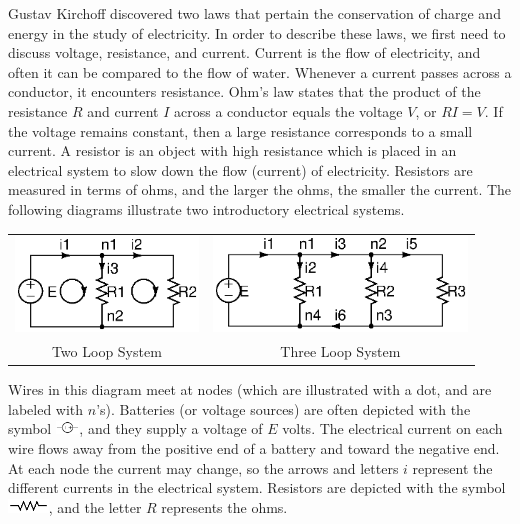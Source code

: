 \documentclass[10pt]{article}
\begin{document}
Gustav Kirchoff discovered two laws that pertain the conservation of charge and energy in the study of electricity.  In order to describe these laws, we first need to discuss voltage, resistance, and current.  Current is the flow of electricity, and often it can be compared to the flow of water.  Whenever a current passes across a conductor, it encounters resistance. Ohm's law states that the product of the resistance $R$ and current $I$ across a conductor equals the voltage $V$, or $RI=V$. If the voltage remains constant, then a large resistance corresponds to a small current. A resistor is an object with high resistance which is placed in an electrical system to slow down the flow (current) of electricity.  Resistors are measured in terms of ohms, and the larger the ohms, the smaller the current.  The following diagrams illustrate two introductory electrical systems.
\begin{center}\begin{tabular}{cc}
\includegraphics[height=1in]{electric-circuit-1}
&
\includegraphics[height=1in]{electric-circuit-2}\\
Two Loop System & Three Loop System
\end{tabular}\end{center}
Wires in this diagram meet at nodes (which are illustrated with a dot, and are labeled with $n$'s).  
Batteries (or voltage sources) are often depicted with the symbol \includegraphics[height=10pt]{battery}, and they supply a voltage of $E$ volts. The electrical current on each wire flows away from the positive end of a battery and toward the negative end. At each node the current may change, so the arrows and letters $i$ represent the different currents in the electrical system. Resistors are depicted with the symbol \includegraphics[height=10pt]{resistor}, and the letter $R$ represents the ohms. 
\end{document}
